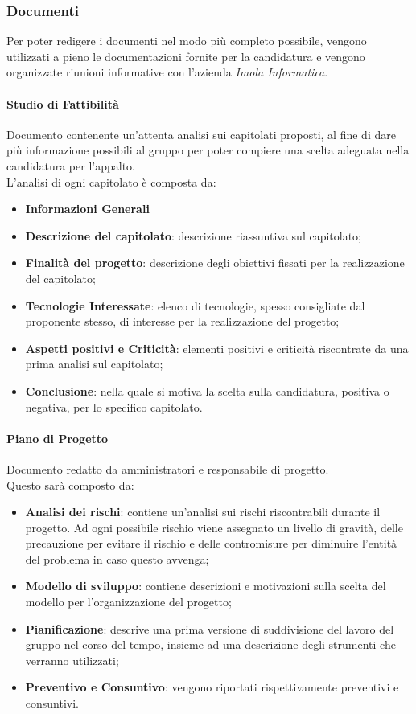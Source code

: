 	\subsubsection{Documenti}
	Per poter redigere i documenti nel modo più completo possibile, vengono utilizzati a pieno le documentazioni fornite per la candidatura e vengono organizzate riunioni informative con l'azienda  \textit{Imola Informatica}.
		
		\paragraph{Studio di Fattibilità}  \hfill \break
	 	Documento contenente un'attenta analisi sui capitolati proposti, al fine di dare più informazione possibili al gruppo per poter compiere una scelta adeguata nella candidatura per l'appalto. \\
	 	L'analisi di ogni capitolato è composta da:
	 	\begin{itemize}
	 		\item \textbf{Informazioni Generali}
	 		\item \textbf{Descrizione del capitolato}: descrizione riassuntiva sul capitolato;
			\item \textbf{Finalità del progetto}: descrizione degli obiettivi fissati per la realizzazione del capitolato;
 			\item \textbf{Tecnologie Interessate}: elenco di tecnologie, spesso consigliate dal proponente stesso, di interesse per la realizzazione del progetto;
	 		\item \textbf{Aspetti positivi e Criticità}: elementi positivi e criticità riscontrate da una prima analisi sul capitolato;
	 		\item \textbf{Conclusione}: nella quale si motiva la scelta sulla candidatura, positiva o negativa, per lo specifico capitolato.
		\end{itemize} 
 		
		\paragraph{Piano di Progetto}  \hfill \break
		Documento redatto da amministratori e responsabile di progetto. \\
    Questo sarà composto da:
		\begin{itemize}
			\item \textbf{Analisi dei rischi}: contiene un'analisi sui rischi riscontrabili durante il progetto. Ad ogni possibile rischio viene assegnato un livello di gravità, delle precauzione per evitare il rischio e delle contromisure per diminuire l'entità del problema in caso questo avvenga; 
			\item \textbf{Modello di sviluppo}: contiene descrizioni e motivazioni sulla scelta del modello per l'organizzazione del progetto;
			\item \textbf{Pianificazione}: descrive una prima versione di suddivisione del lavoro del gruppo nel corso del tempo, insieme ad una descrizione degli strumenti che verranno utilizzati;
			\item \textbf{Preventivo e Consuntivo}: vengono riportati rispettivamente preventivi e consuntivi.
		\end{itemize}
	
